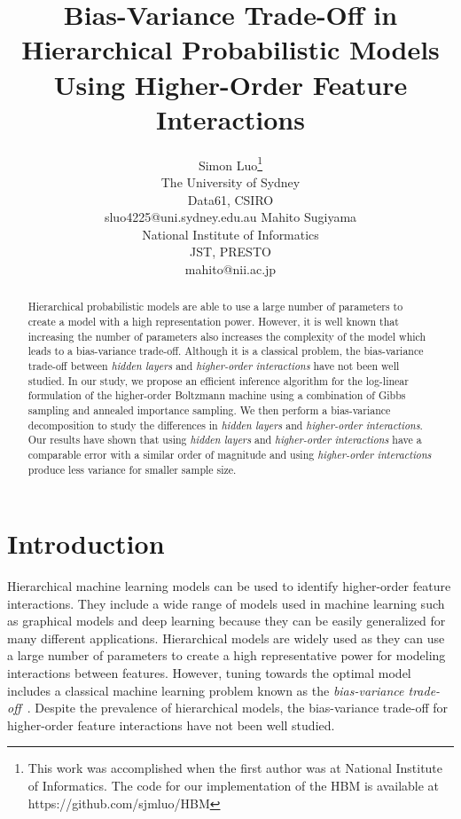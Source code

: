 \documentclass[letterpaper]{article} %
\begin{document}
%
\title{Bias-Variance Trade-Off in Hierarchical Probabilistic Models \\Using Higher-Order Feature Interactions  }
\author{Simon Luo\thanks{This work was accomplished when the first author was at National Institute of Informatics. The code for our implementation of the HBM is available at https://github.com/sjmluo/HBM} \\
        The University of Sydney \\
        Data61, CSIRO \\
        sluo4225@uni.sydney.edu.au
        \And
        Mahito Sugiyama \\
        National Institute of Informatics \\
        JST, PRESTO \\
        mahito@nii.ac.jp
        }
\maketitle
\begin{abstract}
	Hierarchical probabilistic models are able to use a large number of parameters to create a model with a high representation power. However, it is well known that increasing the number of parameters also increases the complexity of the model which leads to a bias-variance trade-off. Although it is a classical problem, the bias-variance trade-off between \textit{hidden layers} and \textit{higher-order interactions} have not been well studied. In our study, we propose an efficient inference algorithm for the log-linear formulation of the higher-order Boltzmann machine using a combination of Gibbs sampling and annealed importance sampling. We then perform a bias-variance decomposition to study the differences in \textit{hidden layers} and \textit{higher-order interactions}. Our results have shown that using \textit{hidden layers} and \textit{higher-order interactions} have a comparable error with a similar order of magnitude and using \textit{higher-order interactions} produce less variance for smaller sample size.
\end{abstract}

\section{Introduction}
	Hierarchical machine learning models can be used to identify higher-order feature interactions. They include a wide range of models used in machine learning such as graphical models and deep learning because they can be easily generalized for many different applications. Hierarchical models are widely used as they can use a large number of parameters to create a high representative power for modeling interactions between features. However, tuning towards the optimal model includes a classical machine learning problem known as the \emph{bias-variance trade-off}~\cite{friedman2001elements}. Despite the prevalence of hierarchical models, the bias-variance trade-off for higher-order feature interactions have not been well studied.
\end{document}
